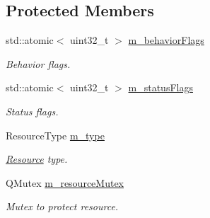 \subsection*{Protected Members}
\begin{DoxyCompactItemize}
\item 
\mbox{\label{classrev_1_1_resource_handle_a2a61bfe01c2b704f139d4223de9164a7}} 
std\+::atomic$<$ uint32\+\_\+t $>$ \mbox{\hyperlink{classrev_1_1_resource_handle_a2a61bfe01c2b704f139d4223de9164a7}{m\+\_\+behavior\+Flags}}
\begin{DoxyCompactList}\small\item\em Behavior flags. \end{DoxyCompactList}\item 
\mbox{\label{classrev_1_1_resource_handle_afc086ecccd0924d611e0256b39b5b6d1}} 
std\+::atomic$<$ uint32\+\_\+t $>$ \mbox{\hyperlink{classrev_1_1_resource_handle_afc086ecccd0924d611e0256b39b5b6d1}{m\+\_\+status\+Flags}}
\begin{DoxyCompactList}\small\item\em Status flags. \end{DoxyCompactList}\item 
\mbox{\label{classrev_1_1_resource_handle_ad49ec7062a1a5bdb46b368c02a228ce6}} 
Resource\+Type \mbox{\hyperlink{classrev_1_1_resource_handle_ad49ec7062a1a5bdb46b368c02a228ce6}{m\+\_\+type}}
\begin{DoxyCompactList}\small\item\em \mbox{\hyperlink{classrev_1_1_resource}{Resource}} type. \end{DoxyCompactList}\item 
\mbox{\label{classrev_1_1_resource_handle_aa8e6a92c35c6336ae6f8d9c1dff7b014}} 
Q\+Mutex \mbox{\hyperlink{classrev_1_1_resource_handle_aa8e6a92c35c6336ae6f8d9c1dff7b014}{m\+\_\+resource\+Mutex}}
\begin{DoxyCompactList}\small\item\em Mutex to protect resource. \end{DoxyCompactList}\item 
\mbox{\label{classrev_1_1_resource_handle_a41b015e217fa62fc4607a878f2e0fba6}} 

\end{DoxyCompactItemize}
